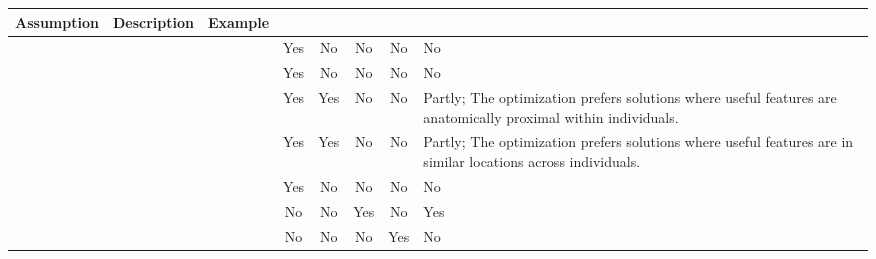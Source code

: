 {\scriptsize \begin{tabular}{L{.15\textwidth} L{.20\textwidth} L{.20\textwidth} c c c c L{.20\textwidth}}
\toprule
Assumption & Description & Example &  &  &   &   &   \\
\midrule
{} &  &  & Yes& No & No & No & No \\
 &  &  & Yes& No & No & No & No \\
 &  &  & Yes& Yes& No & No & Partly; The optimization prefers solutions where useful features are anatomically proximal within individuals. \\
 &  &  & Yes& Yes& No & No & Partly; The optimization prefers solutions where useful features are in similar locations across individuals. \\
 &  &  & Yes& No & No & No & No \\
 &  &  & No & No & Yes& No & Yes\\
 &  &  & No & No & No & Yes& No \\
\bottomrule
\end{tabular}}


